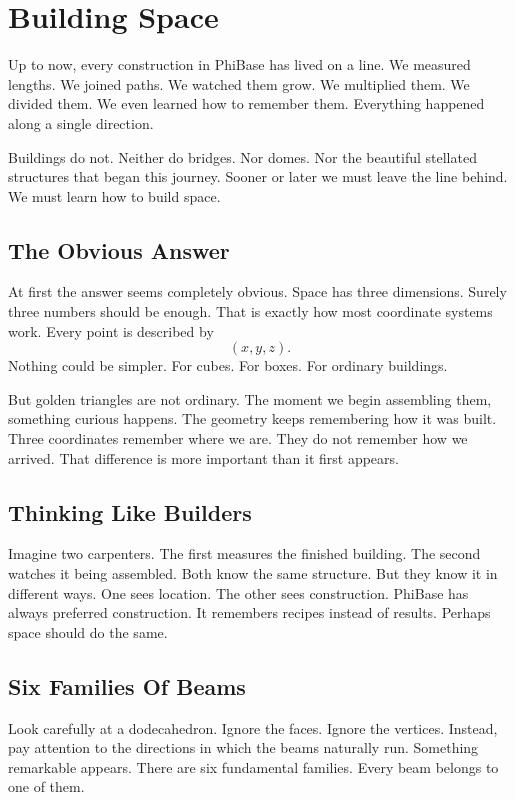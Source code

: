 \chapter{Building Space}
\label{stone:space}

Up to now, every construction in PhiBase has lived on a line. We measured lengths. We joined paths. We watched them grow. We multiplied them. We divided them. We even learned how to remember them. Everything happened along a single direction.

Buildings do not. Neither do bridges. Nor domes. Nor the beautiful stellated structures that began this journey. Sooner or later we must leave the line behind. We must learn how to build space.

\section*{The Obvious Answer}

At first the answer seems completely obvious. Space has three dimensions. Surely three numbers should be enough. That is exactly how most coordinate systems work. Every point is described by
\[
(x,y,z).
\]
Nothing could be simpler. For cubes. For boxes. For ordinary buildings.

But golden triangles are not ordinary. The moment we begin assembling them, something curious happens. The geometry keeps remembering how it was built. Three coordinates remember where we are. They do not remember how we arrived. That difference is more important than it first appears.

\section*{Thinking Like Builders}

Imagine two carpenters. The first measures the finished building. The second watches it being assembled. Both know the same structure. But they know it in different ways. One sees location. The other sees construction. PhiBase has always preferred construction. It remembers recipes instead of results. Perhaps space should do the same.

\section*{Six Families Of Beams}

Look carefully at a dodecahedron. Ignore the faces. Ignore the vertices. Instead, pay attention to the directions in which the beams naturally run. Something remarkable appears. There are six fundamental families. Every beam belongs to one of them.

